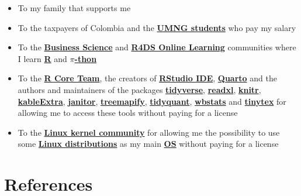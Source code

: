 \documentclass[
  ignorenonframetext,
]{beamer}
\begin{document}
\begin{frame}{}
\label{section-16}
\begin{itemize}
\item
  To my family that supports me
\item
  To the taxpayers of Colombia and the
  \href{https://www.umng.edu.co/estudiante}{\textbf{UMNG students}} who
  pay my salary
\item
  To the \href{https://www.business-science.io/}{\textbf{Business
  Science}} and \href{https://www.rfordatasci.com/}{\textbf{R4DS Online
  Learning}} communities where I learn
  \href{https://www.r-project.org/about.html}{\textbf{R}} and
  \href{https://www.python.org/about/}{\textbf{\(\pi\)-thon}}
\item
  To the \href{https://www.r-project.org/contributors.html}{\textbf{R
  Core Team}}, the creators of
  \href{https://rstudio.com/products/rstudio/}{\textbf{RStudio IDE}},
  \href{https://quarto.org/}{\textbf{Quarto}} and the authors and
  maintainers of the packages
  \href{https://CRAN.R-project.org/package=tidyverse}{\textbf{tidyverse}},
  \href{https://CRAN.R-project.org/package=readxl}{\textbf{readxl}},
  \href{https://CRAN.R-project.org/package=knitr}{\textbf{knitr}},
  \href{https://CRAN.R-project.org/package=kableExtra}{\textbf{kableExtra}},
  \href{https://CRAN.R-project.org/package=janitor}{\textbf{janitor}},
  \href{https://CRAN.R-project.org/package=treemapify}{\textbf{treemapify}},
  \href{https://CRAN.R-project.org/package=tidyquant}{\textbf{tidyquant}},
  \href{https://CRAN.R-project.org/package=wbstats}{\textbf{wbstats}}
  and
  \href{https://CRAN.R-project.org/package=tinytex}{\textbf{tinytex}}
  for allowing me to access these tools without paying for a license
\item
  To the \href{https://www.kernel.org/category/about.html}{\textbf{Linux
  kernel community}} for allowing me the possibility to use some
  \href{https://static.lwn.net/Distributions/}{\textbf{Linux
  distributions}} as my main
  \href{https://en.wikipedia.org/wiki/Operating_system}{\textbf{OS}}
  without paying for a license
\end{itemize}
\end{frame}

\section*{References}\label{references}
\end{document}
